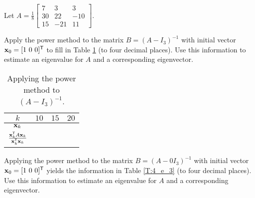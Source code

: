 \begin{activity} \label{act:4_e_3} Let $A = \frac{1}{8}\left[ \begin{array}{crr} 7&3&3 \\ 30&22&-10 \\ 15&-21&11 \end{array} \right]$. 
	\ba
	\item Apply the power method to the matrix $B = (A - I_3)^{-1}$ with initial vector $\vx_0 = [1 \ 0 \ 0]^{\tr}$ to fill in Table \ref{T:4_e_2} (to four decimal places). Use this information to estimate an eigenvalue for $A$ and a corresponding eigenvector. 
\begin{table}[h]
\begin{center}
\renewcommand{\arraystretch}{2.0}
\begin{tabular}{cccc} 
$k$												&$10$		&$15$		&$20$		 \\ \hline
$\mathbf{x}_k$											&\hspace{1.0in}	&\hspace{1.0in}	&\hspace{1.0in}		\\ \hline
$\frac{\mathbf{x}_k^{\mathsf{T}}A\mathbf{x}_k}{\mathbf{x}_k^{\mathsf{T}}\mathbf{x}_k}$ 	&	&	&		\\ \hline
\end{tabular}
\caption{Applying the power method to $(A - I_3)^{-1}$.}
\label{T:4_e_2}
\end{center}
\end{table}



	\item Applying the power method to the matrix $B = (A - 0I_3)^{-1}$ with initial vector $\vx_0 = [1 \ 0 \ 0]^{\tr}$ yields the information in Table \ref{T:4_e_3} (to four decimal places). Use this information to estimate an eigenvalue for $A$ and a corresponding eigenvector. 


\end{activity}
